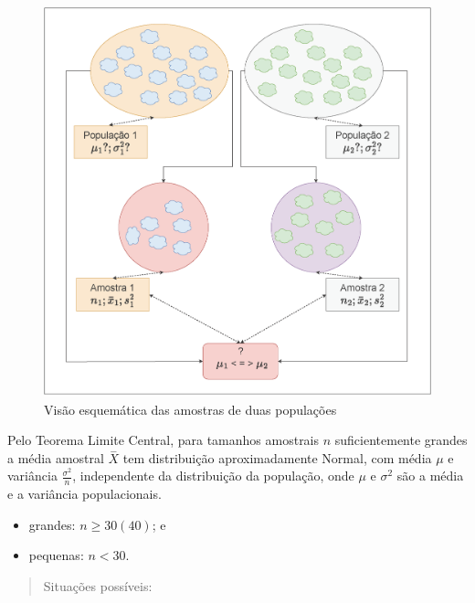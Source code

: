 \documentclass[
]{book}
\providecommand{\tightlist}{%
  \setlength{\itemsep}{0pt}\setlength{\parskip}{0pt}}
\begin{document}
\hfill\break

\begin{figure}

{\centering \includegraphics[width=1\linewidth]{images11/ilustração_01} 

}

\caption{Visão esquemática das amostras de duas populações}\label{fig:fig82}
\end{figure}

\hfill\break

Pelo Teorema Limite Central, para tamanhos amostrais \(n\) suficientemente grandes a média amostral \(\stackrel{-}{X}\) tem distribuição aproximadamente Normal, com média \(\mu\) e variância \(\frac{\sigma^{2}}{n}\), independente da distribuição da população, onde \(\mu\) e \(\sigma^{2}\) são a média e a variância populacionais.

\hfill\break

\begin{itemize}
\tightlist
\item
  grandes: \(n \geq 30 (40)\); e\\
\item
  pequenas: \(n < 30\).
\end{itemize}

\hfill\break

\begin{quote}
Situações possíveis:
\end{quote}
\end{document}
